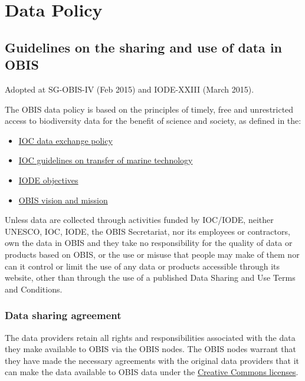 \documentclass[
  letterpaper,
  DIV=11,
  numbers=noendperiod,
  oneside]{scrreprt}
\providecommand{\tightlist}{%
  \setlength{\itemsep}{0pt}\setlength{\parskip}{0pt}}\usepackage{longtable,booktabs,array}
\begin{document}
\hypertarget{data-policy}{%
\section{Data Policy}\label{data-policy}}

\hypertarget{guidelines-on-the-sharing-and-use-of-data-in-obis-1}{%
\subsection{Guidelines on the sharing and use of data in
OBIS}\label{guidelines-on-the-sharing-and-use-of-data-in-obis-1}}

Adopted at SG-OBIS-IV (Feb 2015) and IODE-XXIII (March 2015).

The OBIS data policy is based on the principles of timely, free and
unrestricted access to biodiversity data for the benefit of science and
society, as defined in the:

\begin{itemize}
\tightlist
\item
  \href{http://iode.org/policy}{IOC data exchange policy}
\item
  \href{http://unesdoc.unesco.org/images/0013/001391/139193m.pdf}{IOC
  guidelines on transfer of marine technology}
\item
  \href{http://www.iode.org/index.php?option=com_content\&view=article\&id=385\&Itemid=34}{IODE
  objectives}
\item
  \href{https://obis.org/about/}{OBIS vision and mission}
\end{itemize}

Unless data are collected through activities funded by IOC/IODE, neither
UNESCO, IOC, IODE, the OBIS Secretariat, nor its employees or
contractors, own the data in OBIS and they take no responsibility for
the quality of data or products based on OBIS, or the use or misuse that
people may make of them nor can it control or limit the use of any data
or products accessible through its website, other than through the use
of a published Data Sharing and Use Terms and Conditions.

\hypertarget{data-sharing-agreement}{%
\subsubsection{Data sharing agreement}\label{data-sharing-agreement}}

The data providers retain all rights and responsibilities associated
with the data they make available to OBIS via the OBIS nodes. The OBIS
nodes warrant that they have made the necessary agreements with the
original data providers that it can make the data available to OBIS data
under the \protect\hyperlink{licenses}{Creative Commons licenses}.
\end{document}

